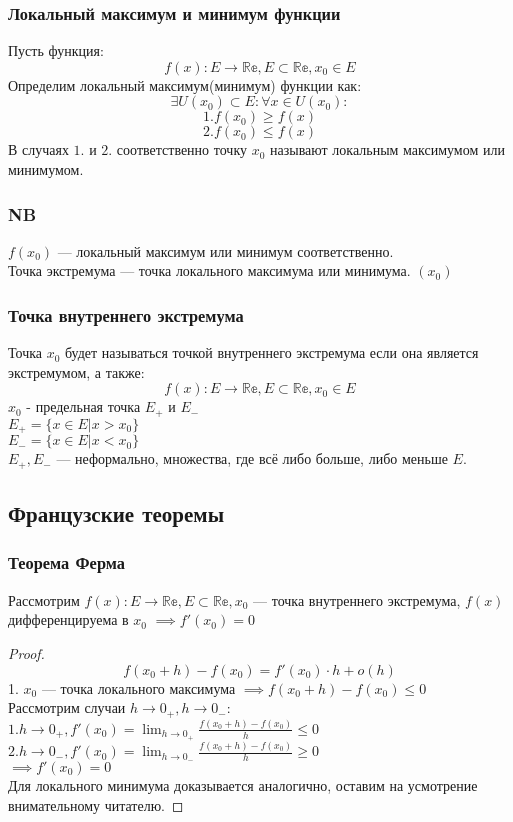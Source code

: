 \subsubsection{Локальный максимум и минимум функции}
Пусть функция:
\[
    f(x): E \to \mathbb{Re}, E \subset \mathbb{Re}, x_0 \in E
\]
Определим локальный максимум(минимум) функции как:
\[
    \exists U(x_0) \subset E: \forall x \in U(x_0):
\]
\[
   1. f(x_0) \ge f(x) 
\]
\[
   2. f(x_0) \le f(x)
\]
В случаях $1.$ и $2.$ соответственно точку $x_0$ называют локальным максимумом или минимумом.

\subsubsection*{NB}
$f(x_0)$ --- локальный максимум или минимум соответственно.\\
Точка экстремума --- точка локального максимума или минимума. $(x_0)$

\subsubsection{Точка внутреннего экстремума}
Точка $x_0$ будет называться точкой внутреннего экстремума если она является экстремумом, а также:
\[
    f(x): E \to \mathbb{Re}, E \subset \mathbb{Re}, x_0 \in E
\]
$x_0$ - предельная точка $E_+$ и $E_-$\\
\( E_+ = \{x \in E | x > x_0\} \)\\
\( E_- = \{x \in E | x < x_0\} \)\\
$E_+, E_-$ --- неформально, множества, где всё либо больше, либо меньше $E$.


\subsection{Французские теоремы}

\subsubsection{Теорема Ферма}
Рассмотрим \(f(x): E \to \mathbb{Re}, E \subset \mathbb{Re}, x_0\) --- точка внутреннего экстремума,
$f(x)$ дифференцируема в $x_0$ \( \implies f'(x_0) = 0 \)
\begin{proof}
    \[ f(x_0 + h) - f(x_0) = f'(x_0)\cdot h + o(h)\]
    1. \(x_0 \text{ --- точка локального максимума } \implies f(x_0+h) - f(x_0) \le 0 \)\\
    Рассмотрим случаи \(h \to 0_+, h \to 0_-\):\\
    \(1. h \to 0_+, f'(x_0) = \lim_{h \to 0_+} \frac{f(x_0 + h) - f(x_0)}{h} \le 0 \)\\
    \(2. h \to 0_-, f'(x_0) = \lim_{h \to 0_-} \frac{f(x_0 + h) - f(x_0)}{h} \ge 0 \)\\
    \(\implies f'(x_0) = 0\)\\
    Для локального минимума доказывается аналогично, оставим на усмотрение внимательному читателю.
\end{proof}
